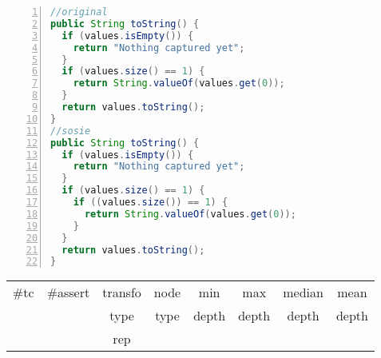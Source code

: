 \begin{minipage}{\columnwidth}
\begin{lstlisting}[caption={\texttt{toString} in EasyMock and a sosie},language=java,numbers=left]
//original
public String toString() {
  if (values.isEmpty()) {
    return "Nothing captured yet";
  }
  if (values.size() == 1) {
    return String.valueOf(values.get(0));
  }
  return values.toString();
}
//sosie
public String toString() {
  if (values.isEmpty()) {
    return "Nothing captured yet";
  }
  if (values.size() == 1) {
    if ((values.size()) == 1) {
      return String.valueOf(values.get(0));
    }
  }
  return values.toString();
}
\end{lstlisting}
\tabcolsep=0.11cm
\begin{tabular}{>{\small}c>{\small}c>{\small}c>{\small}c>{\small}c>{\small}c>{\small}c>{\small}c}
\hline
\rowcolor{lightgray} \#tc & \#assert & transfo & node & min & max & median & mean   \\
\rowcolor{lightgray}  & & type & type & depth  & depth & depth & depth  \\ 
\hline
&  & rep &  &  &  &  & \\
\hline
\end{tabular}
\end{minipage}